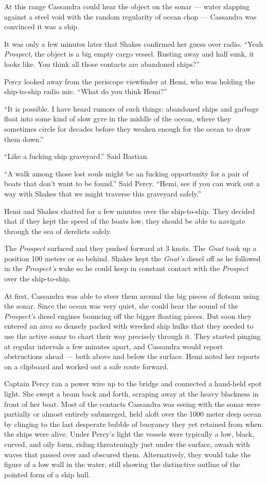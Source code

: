 \documentclass[
]{scrbook}
\begin{document}
At this range Cassandra could hear the object on the sonar --- water
slapping against a steel void with the random regularity of ocean chop
--- Cassandra was convinced it was a ship.

It was only a few minutes later that Shakes confirmed her guess over
radio. ``Yeah \emph{Prospect}, the object is a big empty cargo vessel.
Rusting away and half sunk, it looks like. You think all those contacts
are abandoned ships?''

Percy looked away from the periscope viewfinder at Hemi, who was holding
the ship-to-ship radio mic. ``What do you think Hemi?''

``It is possible. I have heard rumors of such things: abandoned ships
and garbage float into some kind of slow gyre in the middle of the
ocean, where they sometimes circle for decades before they weaken enough
for the ocean to draw them down.''

``Like a fucking ship graveyard.'' Said Bastian.

``A walk among those lost souls might be an fucking opportunity for a
pair of boats that don't want to be found.'' Said Percy. ``Hemi, see if
you can work out a way with Shakes that we might traverse this graveyard
safely.''

Hemi and Shakes chatted for a few minutes over the ship-to-ship. They
decided that if they kept the speed of the boats low, they should be
able to navigate through the sea of derelicts safely.

The \emph{Prospect} surfaced and they pushed forward at 3 knots. The
\emph{Gnat} took up a position 100 meters or so behind. Shakes kept the
\emph{Gnat's} diesel off as he followed in the \emph{Prospect's} wake so
he could keep in constant contact with the \emph{Prospect} over the
ship-to-ship.

At first, Cassandra was able to steer them around the big pieces of
flotsam using the sonar. Since the ocean was very quiet, she could hear
the sound of the \emph{Prospect's} diesel engines bouncing off the
bigger floating pieces. But soon they entered an area so densely packed
with wrecked ship hulks that they needed to use the active sonar to
chart their way precisely through it. They started pinging at regular
intervals a few minutes apart, and Cassandra would report obstructions
ahead --- both above and below the surface. Hemi noted her reports on a
clipboard and worked out a safe route forward.

Captain Percy ran a power wire up to the bridge and connected a
hand-held spot light. She swept a beam back and forth, scraping away at
the heavy blackness in front of her boat. Most of the contacts Cassandra
was seeing with the sonar were partially or almost entirely submerged,
held aloft over the 1000 meter deep ocean by clinging to the last
desperate bubble of buoyancy they yet retained from when the ships were
alive. Under Percy's light the vessels were typically a low, black,
curved, and oily form, riding threateningly just under the surface,
awash with waves that passed over and obscured them. Alternatively, they
would take the figure of a low wall in the water, still showing the
distinctive outline of the pointed form of a ship hull.
\end{document}

